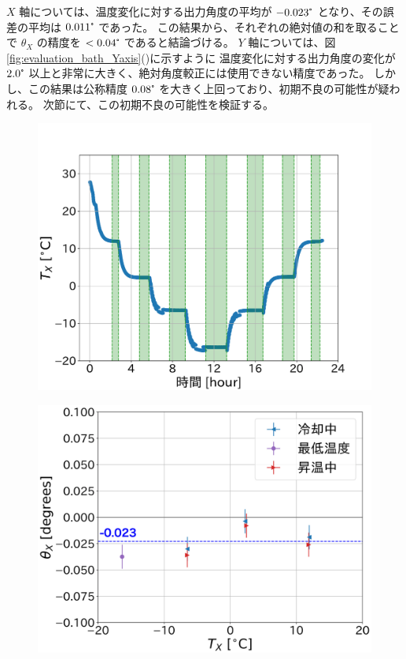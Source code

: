 \documentclass[../../main.tex]{subfiles}
\begin{document}
$X$ 軸については、温度変化に対する出力角度の平均が $-0.023\tcdegree$ となり、その誤差の平均は $0.011\tcdegree$ であった。
この結果から、それぞれの絶対値の和を取ることで $\theta_{X}$ の精度を $<0.04\tcdegree$ であると結論づける。
$Y$ 軸については、図\ref{fig:evaluation_bath_Yaxis}()に示すように
温度変化に対する出力角度の変化が $2.0\tcdegree$ 以上と非常に大きく、絶対角度較正には使用できない精度であった。
しかし、この結果は公称精度 $0.08\tcdegree$ を大きく上回っており、初期不良の可能性が疑われる。
次節にて、この初期不良の可能性を検証する。
\begin{figure}[H]
    \begin{minipage}[b]{0.45\columnwidth}
        \centering
        \includegraphics[width=1.1\columnwidth]{tiltsensor/bath_tempX.pdf}
        \subcaption{}
        \label{fig:bath_tempX}
    \end{minipage}
    \hspace{0.005\columnwidth}
    \begin{minipage}[b]{0.45\columnwidth}
        \centering
        \includegraphics[width=1.065\columnwidth]{tiltsensor/angleX_temp_dep.pdf}

\end{minipage}
\end{figure}
\end{document}

